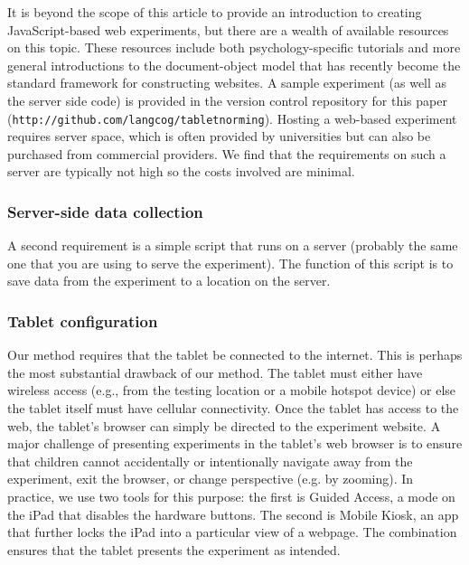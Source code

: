 \documentclass[man,noapacite]{apa2}
\begin{document}
It is beyond the scope of this article to provide an introduction to creating JavaScript-based web experiments, but there are a wealth of available resources on this topic. These resources include both psychology-specific tutorials and more general introductions to the document-object model that has recently become the standard framework for constructing websites. A sample experiment (as well as the server side code) is provided in the version control repository for this paper (\texttt{http://github.com/langcog/tablet\textunderscore norming}). Hosting a web-based experiment requires server space, which is often provided by universities but can also be purchased from commercial providers. We find that the requirements on such a server are typically not high so the costs involved are minimal.


\subsubsection{Server-side data collection}

A second requirement is a simple script that runs on a server (probably the same one that you are using to serve the experiment). The function of this script is to save data from the experiment to a location on the server.

\subsubsection{Tablet configuration}

Our method requires that the tablet be connected to the internet. This is perhaps the most substantial drawback of our method. The tablet must either have wireless access (e.g., from the testing location or a mobile hotspot device) or else the tablet itself must have cellular connectivity. Once the tablet has access to the web, the tablet's browser can simply be directed to the experiment website. A major challenge of presenting experiments in the tablet's web browser is to ensure that children cannot accidentally or intentionally navigate away from the experiment, exit the browser, or change perspective (e.g. by zooming).
In practice, we use two tools for this purpose: the first is Guided Access, a mode on the iPad that disables the hardware buttons. The second is Mobile Kiosk, an app that further locks the iPad into a particular view of a webpage. The combination ensures that the tablet presents the experiment as intended.
\end{document}
